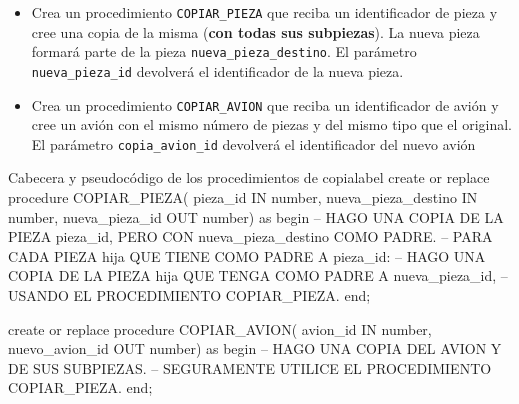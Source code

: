 \needspace{.15\textheight}
\begin{homeworkProblem}
  \begin{itemize}
  \item Crea un procedimiento \texttt{COPIAR\_PIEZA}
    que reciba un identificador de pieza y cree una copia de la misma (\textbf{con todas sus subpiezas}). La nueva pieza
    formará parte de la pieza \texttt{nueva\_pieza\_destino}. El parámetro \texttt{nueva\_pieza\_id} devolverá el
    identificador de la nueva pieza.

   
  \item Crea un procedimiento \texttt{COPIAR\_AVION} que reciba un identificador de avión y cree un avión con el mismo número de piezas y del mismo tipo que
    el original. El parámetro \texttt{copia\_avion\_id} devolverá el identificador del nuevo avión
  \end{itemize}

\begin{listadosql}{Cabecera y pseudocódigo de los procedimientos de copia}{label}
create or replace procedure COPIAR_PIEZA(
  pieza_id IN number, 
  nueva_pieza_destino IN number, 
  nueva_pieza_id OUT number) 
as
begin
  -- HAGO UNA COPIA DE LA PIEZA pieza_id, PERO CON nueva_pieza_destino COMO PADRE.
  -- PARA CADA PIEZA hija QUE TIENE COMO PADRE A pieza_id:
  --   HAGO UNA COPIA DE LA PIEZA hija QUE TENGA COMO PADRE A nueva_pieza_id,
  --   USANDO EL PROCEDIMIENTO COPIAR_PIEZA.
end; 

create or replace procedure COPIAR_AVION(
  avion_id IN number, 
  nuevo_avion_id OUT number) 
as
begin
  -- HAGO UNA COPIA DEL AVION Y DE SUS SUBPIEZAS.
  -- SEGURAMENTE UTILICE EL PROCEDIMIENTO COPIAR_PIEZA.
end;
\end{listadosql}

\end{homeworkProblem}

